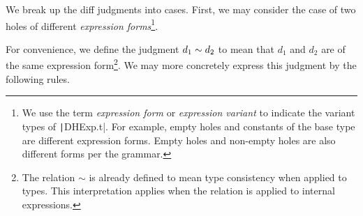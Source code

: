 \begin{singlespace}

\end{singlespace}

We break up the diff judgments into cases. First, we may consider the case of two holes of different \textit{expression forms}\footnote{We use the term \textit{expression form} or \textit{expression variant} to indicate the variant types of \texttt|DHExp.t|. For example, empty holes and constants of the base type are different expression forms. Empty holes and non-empty holes are also different forms per the grammar.}.

For convenience, we define the judgment $d_1\sim d_2$ to mean that $d_1$ and $d_2$ are of the same expression form\footnote{The relation $\sim$ is already defined to mean type consistency when applied to types. This interpretation applies when the relation is applied to internal expressions.}. We may more concretely express this judgment by the following rules.

\begin{singlespace}
\end{singlespace}

